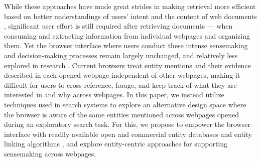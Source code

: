 While these approaches have made great strides in making retrieval more efficient based on better understandings of users' intent \cite{miliaraki2015selena} and the content of web documents \cite{fernandez2008semantic}, significant user effort is still required after retrieving documents --- when consuming and extracting information from individual webpages and organizing them. Yet the browser interface where users conduct these intense sensemaking and decision-making processes remain largely unchanged, and relatively less explored in research \cite{whatwentwrong}. Current browsers treat entity mentions and their evidence described in each opened webpage independent of other webpages, making it difficult for users to cross-reference, forage, and keep track of what they are interested in and why across webpages. In this paper, we instead utilize techniques used in search systems to explore an alternative design space where the browser is aware of the same entities mentioned across webpages opened during an exploratory search task. For this, we propose to empower the browser interface with readily available open and commercial entity databases \cite{dbpedia} and entity linking algorithms \cite{spotlight}, and explore entity-centric approaches for supporting sensemaking across webpages.